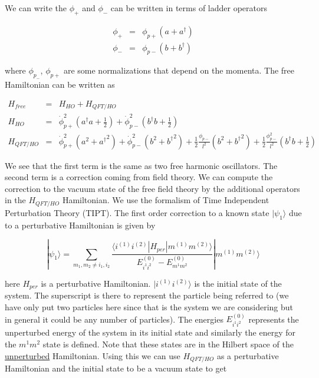 \documentclass[aps,showpacs,onecolumn,floats,prd,superscriptaddress,nofootinbib]{revtex4-1}
\begin{document}
We can write the $\phi_+$ and $\phi_-$ can be written in terms of ladder operators

\begin{eqnarray}
	\phi_+ & = & \phi_{p+} (a+a^\dagger)	\nonumber	\\
	\phi_- & = & \phi_{p-}(b+b^\dagger)
\end{eqnarray}

where $\phi_{p_-}$, $\phi_{p+}$ are some normalizations that depend on the momenta. The free Hamiltonian can be written as

\begin{eqnarray}
	H_{free} & = & H_{HO} + H_{QFT/HO}	\nonumber	\\
	H_{HO} & = & \dot{\phi}^2_{p+} \left( a^\dagger a + \frac{1}{2} \right) + \dot{\phi}^2_{p-} \left( b^\dagger b + \frac{1}{2} \right)	\nonumber	\\
	H_{QFT/HO} & = & \dot{\phi}^2 _{p+} \left(a^2 + {a^\dagger}^2 \right) + \dot{\phi}^2_{p-} \left(b^2 + {b^\dagger}^2 \right) + \frac{1}{2} \frac{\phi_{p-}}{l^2} \left( b^2 + {b^\dagger}^2 \right) + \frac{1}{2} \frac{\phi^2_{p-}}{l^2} \left( b^\dagger b + \frac{1}{2} \right) 
\end{eqnarray}

We see that the first term is the same as two free harmonic oscillators. 
The second term is a correction coming from field theory. 
We can compute the correction to the vacuum state of the free field theory by the additional operators in the $H_{QFT/HO}$ Hamiltonian. 
We use the formalism of Time Independent Perturbation Theory (TIPT). The first order correction to a known state $|\psi_1 \rangle$ due to a perturbative Hamiltonian is given by

\begin{equation}
	|\psi_1 \rangle  = \sum_{m_1, m_2 \neq i_1,i_2} \frac{\langle i^{(1)} i^{(2)}|H_{per}|m^{(1)} m^{(2)} \rangle}{E^{(0)}_{i^1i^2} - E^{(0)}_{m^1m^2}} |m^{(1)}m^{(2)} \rangle 
\end{equation}

here $H_{per}$ is a perturbative Hamiltonian. $|i^{(1)} i^{(2)}\rangle$ is the initial state of the system. 
The superscript is there to represent the particle being referred to (we have only put two particles here since that is the system we are considering but in general it could be any number of particles). 
The energies $E^{(0)}_{i^1i^2}$ represents the unperturbed energy of the system in its initial state and similarly the energy for the $m^1m^2$ state is defined. 
Note that these states are in the Hilbert space of the \underline{unperturbed} Hamiltonian. 
Using this we can use $H_{QFT/HO}$ as a perturbative Hamiltonian and the initial state to be a vacuum state to get 
\end{document}
